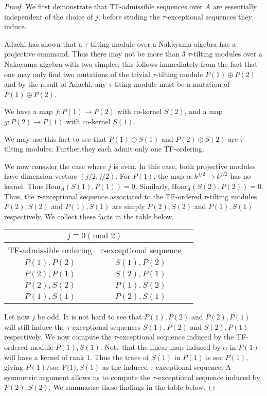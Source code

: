 \documentclass[]{article}
\theoremstyle{definition}
\newcommand{\tu}{\ensuremath{\tau}}
\begin{document}
\begin{proof}
	We first demonstrate that TF-admissible sequences over $A$ are essentially independent of the choice of $j$, before studing the \tu-exceptional sequences they induce.
	
	
	Adachi has shown that a \tu-tilting module over a Nakayama algebra has a projective summand. Thus there may not be more than $3$ \tu-tilting modules over a Nakayama algebra with two simples; this follows immediately from the fact that one may only find two mutations of the trivial \tu-tilting module $P(1) \oplus P(2)$ and by the result of Adachi, any \tu-titing module must be a mutation of $P(1) \oplus P(2)$.
	
	We have a map $f:P(1) \to P(2)$ with co-kernel $S(2)$, and a map $g:P(2) \to P(1)$ with co-kernel $S(1)$.
	
	We may use this fact to see that $P(1) \oplus S(1)$ and $P(2) \oplus S(2)$ are \tu-tilting modules. Further,they each admit only one TF-ordering. 
	
	We now consider the case where $j$ is even. In this case, both projective modules have dimension vectors $(j/2,j/2)$. For $P(1)$, the map $\alpha:k^{j/2} \to k^{j/2}$ has no kernel. Thus $\text{Hom}_A(S(1),P(1)) = 0$. Similarly, $\text{Hom}_A(S(2),P(2)) = 0$. Thus, the \tu-exceptional sequence associated to the TF-ordered \tu-tilting modules $P(2),S(2)$ and $P(1),S(1)$ are simply $P(2),S(2)$ and $P(1),S(1)$ respectively. We collect these facts in the table below. 
	
	
		\begin{center}
			
		\begin{tabular}{ |c|c|c| } 
			\hline
			\multicolumn{2}{|c|}{$j \equiv 0 (\text{mod }2)$} \\
			\hline
			TF-admissible ordering & $\tau$-exceptional sequence \\
			\hline
			$P(1),P(2)$ & $S(1),P(2)$ \\ 
			$P(2),P(1)$ & $S(2),P(1)$ \\ 
			$P(2),S(2)$ & $P(1),S(2)$\\ 
			$P(1),S(1)$ & $P(2),S(1)$ \\
			\hline
		\end{tabular}
	\end{center}

	Let now $j$ be odd. It is not hard to see that $P(1),P(2)$ and $P(2),P(1)$ will still induce the \tu-exceptional sequences $S(1),P(2)$ and $S(2),P(1)$ respectively. We now compute the \tu-exceptional sequence induced by the TF-ordered module $P(1),S(1)$. Note that the linear map induced by $\alpha$ in $P(1)$ will have a kernel of rank $1$. Thus the trace of $S(1)$ in $P(1)$ is $\text{soc } P(1)$, giving $P(1)/\text{soc P(1)},S(1)$ as the induced \tu-exceptional sequence. A symmetric argument allows us to compute the \tu-exceptional sequence induced by $P(2),S(2)$. We summarise these findings in the table below.
	

\end{proof}
\end{document}
